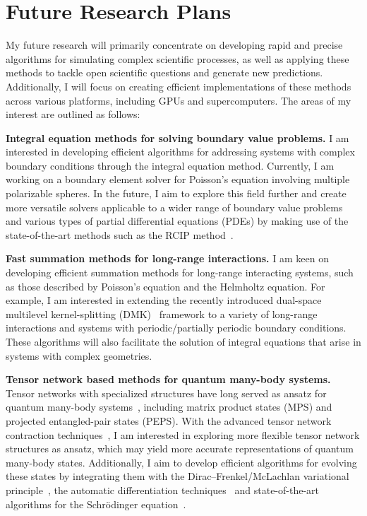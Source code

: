 \section{Future Research Plans}

My future research will primarily concentrate on developing rapid and precise algorithms for simulating complex scientific processes, as well as applying these methods to tackle open scientific questions and generate new predictions. Additionally, I will focus on creating efficient implementations of these methods across various platforms, including GPUs and supercomputers. The areas of my interest are outlined as follows:

\textbf{Integral equation methods for solving boundary value problems.}
I am interested in developing efficient algorithms for addressing systems with complex boundary conditions through the integral equation method. Currently, I am working on a boundary element solver for Poisson's equation involving multiple polarizable spheres. In the future, I aim to explore this field further and create more versatile solvers applicable to a wider range of boundary value problems and various types of partial differential equations (PDEs) by making use of the state-of-the-art methods such as the RCIP method~\cite{helsing2013rcip}.

\textbf{Fast summation methods for long-range interactions.}
I am keen on developing efficient summation methods for long-range interacting systems, such as those described by Poisson's equation and the Helmholtz equation.
For example, I am interested in extending the recently introduced dual-space multilevel kernel-splitting (DMK)~\cite{jiang2023dmk, greengard2024new} framework to a variety of long-range interactions and systems with periodic/partially periodic boundary conditions.
These algorithms will also facilitate the solution of integral equations that arise in systems with complex geometries.

\textbf{Tensor network based methods for quantum many-body systems.}
Tensor networks with specialized structures have long served as ansatz for quantum many-body systems~\cite{itensor}, including matrix product states (MPS) and projected entangled-pair states (PEPS). 
With the advanced tensor network contraction techniques~\cite{roa2024probabilistic}, I am interested in exploring more flexible tensor network structures as ansatz, which may yield more accurate representations of quantum many-body states.
Additionally, I aim to develop efficient algorithms for evolving these states by integrating them with the Dirac–Frenkel/McLachlan variational principle~\cite{RAAB2000674}, the automatic differentiation techniques~\cite{LIAO2019} and state-of-the-art algorithms for the Schr\"odinger equation~\cite{SCHWENDT2020107048, kaye2023fast}.
